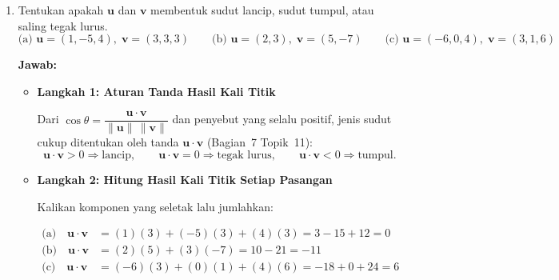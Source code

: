 \documentclass[10pt,a4paper]{article}
\newcounter{eqblock}
\newcommand{\reseteq}{%
  \stepcounter{eqblock}%
  \setcounter{equation}{0}%
  \renewcommand{\theHequation}{\arabic{eqblock}.\arabic{equation}}%
}
\begin{document}
\begin{enumerate}
\begin{enumerate}
\begin{itemize}
Norm adalah bilangan real (skalar), sehingga yang dihitung di sini adalah selisih bilangan biasa:
\begin{align}
(\|\mathbf{u}\| - \|\mathbf{v}\|) - \|\mathbf{w}\| &= \sqrt{14} - 4\sqrt{5} - \sqrt{53} \nonumber \\
&\approx 3{,}742 - 8{,}944 - 7{,}280 \approx -12{,}48
\end{align}
Hasilnya berupa \textbf{skalar} dan boleh negatif karena bukan panjang suatu vektor. Bandingkan dengan panjang hasil (a): $\|(-13, 2, -2)\| = \sqrt{177} \approx 13{,}30$; nilainya berbeda karena norm tidak dapat dikurangkan komponen demi komponen.
\end{itemize}

\end{enumerate}

\item Tentukan apakah $\mathbf{u}$ dan $\mathbf{v}$ membentuk sudut lancip, sudut tumpul, atau saling tegak lurus.
\[
\text{(a) } \mathbf{u} = (1, -5, 4),\; \mathbf{v} = (3, 3, 3) \qquad
\text{(b) } \mathbf{u} = (2, 3),\; \mathbf{v} = (5, -7) \qquad
\text{(c) } \mathbf{u} = (-6, 0, 4),\; \mathbf{v} = (3, 1, 6)
\]

\textbf{Jawab:}
\begin{itemize}
\item \textbf{Langkah 1: Aturan Tanda Hasil Kali Titik}

Dari $\cos\theta = \dfrac{\mathbf{u} \cdot \mathbf{v}}{\|\mathbf{u}\|\,\|\mathbf{v}\|}$ dan penyebut yang selalu positif, jenis sudut cukup ditentukan oleh tanda $\mathbf{u} \cdot \mathbf{v}$ (Bagian~7 Topik~11):
\[
\mathbf{u} \cdot \mathbf{v} > 0 \Rightarrow \text{lancip}, \qquad
\mathbf{u} \cdot \mathbf{v} = 0 \Rightarrow \text{tegak lurus}, \qquad
\mathbf{u} \cdot \mathbf{v} < 0 \Rightarrow \text{tumpul}.
\]

\item \textbf{Langkah 2: Hitung Hasil Kali Titik Setiap Pasangan}

Kalikan komponen yang seletak lalu jumlahkan:
\reseteq
\begin{align}
\text{(a)}\quad \mathbf{u} \cdot \mathbf{v} &= (1)(3) + (-5)(3) + (4)(3) = 3 - 15 + 12 = 0 \\
\text{(b)}\quad \mathbf{u} \cdot \mathbf{v} &= (2)(5) + (3)(-7) = 10 - 21 = -11 \\
\text{(c)}\quad \mathbf{u} \cdot \mathbf{v} &= (-6)(3) + (0)(1) + (4)(6) = -18 + 0 + 24 = 6
\end{align}


\end{itemize}
\end{enumerate}
\end{document}
